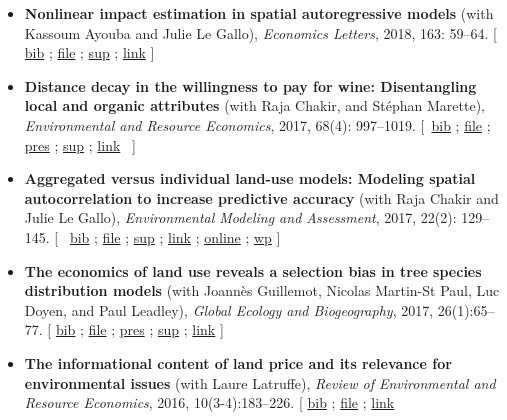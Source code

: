 \documentclass[12pt, a4paper]{./style}
\begin{document}
\begin{itemize}
{An estimation based} \textbf{on the demand for building land
in France} (with Jean Cavailhès, Mohamed Hilal and
Julie Le Gallo), \emph{Economics and Statistics}, 2018,
500-501-502, 45--67.  [ \href{bib/PCPX.bib}{bib} ; \href{doc/PCPX-FILE.pdf}{file} ; \href{doc/PCPX-SUP.pdf}{sup} ; \href{https://insee.fr/en/statistiques/3621981?sommaire=3622133}{link} ]
\item \textbf{Nonlinear impact estimation in spatial autoregressive
models} (with Kassoum Ayouba and Julie Le Gallo),
\emph{Economics Letters}, 2018, 163: 59--64. [ \href{bib/NLSP.bib}{bib} ; \href{doc/NLSP-FILE.pdf}{file} ;
\href{doc/NLSP-SUP.pdf}{sup} ; \href{https://www.sciencedirect.com/science/article/pii/S0165176517304846}{link} ]
\item \textbf{Distance decay in the willingness to pay for wine:
Disentangling local and organic attributes} (with Raja
Chakir, and Stéphan Marette), \emph{Environmental and
Resource Economics}, 2017, 68(4):
997--1019. [~\href{bib/DWTP.bib}{bib} ; \href{doc/DWTP-FILE.pdf}{file} ; \href{doc/DWTP-PRES.pdf}{pres} ; \href{doc/DWTP-SUP.pdf}{sup} ;
\href{https://link.springer.com/article/10.1007/s10640-016-0057-8}{link}~ ]
\item \textbf{Aggregated versus individual land-use models: Modeling
spatial autocorrelation} \textbf{to increase predictive
accuracy} (with Raja Chakir and Julie Le Gallo),
\emph{Environmental Modeling and Assessment}, 2017, 22(2):
129--145. [~ \href{bib/LUMP.bib}{bib} ; \href{doc/LUMP-FILE.pdf}{file} ; \href{doc/LUMP-SUP.pdf}{sup} ; \href{https://link.springer.com/article/10.1007/s10666-016-9523-5}{link} ; \href{https://github.com/jsay/spatial-pred-R}{online} ;
\href{https://www6.versailles-grignon.inra.fr/economie\_publique/Media/fichiers/Working-Papers/Working-Papers-2014/WP\_2014\_02}{wp} ]
\item \textbf{The economics of land use reveals a selection bias in
tree species distribution models} (with Joannès
Guillemot, Nicolas Martin-St Paul, Luc Doyen, and Paul
Leadley), \emph{Global Ecology and Biogeography}, 2017,
26(1):65--77. [ \href{bib/NTSDM.bib}{bib} ; \href{doc/NTSDM-FILE.pdf}{file} ; \href{doc/NTSDM-PRES.pdf}{pres} ; \href{doc/NTSDM-SUP.pdf}{sup} ; \href{https://onlinelibrary.wiley.com/doi/abs/10.1111/geb.12514}{link} ]
\item \textbf{The informational content of land price and its
relevance for environmental issues} (with Laure
Latruffe), \emph{Review of Environmental and Resource
Economics}, 2016, 10(3-4):183--226. [ \href{bib/RLP.bib}{bib} ; \href{doc/RLP-FILE.pdf}{file} ; \href{https://www.nowpublishers.com/article/Details/IRERE-0086}{link}

\end{itemize}
\end{document}
